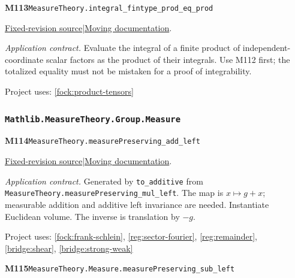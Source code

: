 \documentclass[11pt,a4paper]{article}
\theoremstyle{definition}
\theoremstyle{remark}
\begin{document}
\noindent\textbf{M113}\label{base:M113}\quad\nolinkurl{MeasureTheory.integral_fintype_prod_eq_prod}

\href{https://github.com/leanprover-community/mathlib4/blob/9bac2d0692944a775113f7c130fd5e5b4608a854/Mathlib/MeasureTheory/Integral/Pi.lean}{Fixed-revision source}\quad|\quad\href{https://leanprover-community.github.io/mathlib4_docs/Mathlib/MeasureTheory/Integral/Pi.html#MeasureTheory.integral_fintype_prod_eq_prod}{Moving documentation}.\par
\noindent\textit{Application contract.} Evaluate the integral of a finite product of independent-coordinate scalar factors as the product of their integrals. Use M112 first; the totalized equality must not be mistaken for a proof of integrability.\par
{\small Project uses: \ref{fock:product-tensors}}\par\medskip

\subsubsection*{\nolinkurl{Mathlib.MeasureTheory.Group.Measure}}
\noindent\textbf{M114}\label{base:M114}\quad\nolinkurl{MeasureTheory.measurePreserving_add_left}

\href{https://github.com/leanprover-community/mathlib4/blob/9bac2d0692944a775113f7c130fd5e5b4608a854/Mathlib/MeasureTheory/Group/Measure.lean}{Fixed-revision source}\quad|\quad\href{https://leanprover-community.github.io/mathlib4_docs/Mathlib/MeasureTheory/Group/Measure.html#MeasureTheory.measurePreserving_add_left}{Moving documentation}.\par
\noindent\textit{Application contract.} Generated by \nolinkurl{to_additive} from \nolinkurl{MeasureTheory.measurePreserving_mul_left}. The map is $x\mapsto g+x$; measurable addition and additive left invariance are needed. Instantiate Euclidean volume. The inverse is translation by $-g$.\par
{\small Project uses: \ref{fock:frank-schlein}, \ref{reg:sector-fourier}, \ref{reg:remainder}, \ref{bridge:shear}, \ref{bridge:strong-weak}}\par\medskip

\noindent\textbf{M115}\label{base:M115}\quad\nolinkurl{MeasureTheory.Measure.measurePreserving_sub_left}
\end{document}
